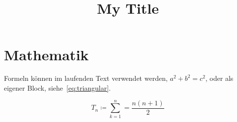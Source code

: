 \documentclass{scrartcl}
\title{My Title}
\begin{document}
\section{Mathematik}

Formeln können im laufenden Text verwendet werden, \(a^2 + b^2 = c^2\),
oder als eigener Block, siehe~\cref{eq:triangular}.

\begin{equation}
  \label{eq:triangular}
  T_n \coloneqq \sum^{n}_{k=1} = \frac{n(n+1)}{2}
\end{equation}
\end{document}
